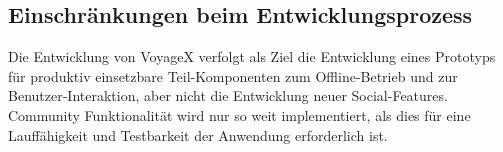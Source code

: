 \subsection{Einschränkungen beim Entwicklungsprozess}\label{4_ES}
Die Entwicklung von VoyageX verfolgt als Ziel die Entwicklung eines Prototyps für produktiv einsetzbare Teil-Komponenten zum Offline-Betrieb und zur Benutzer-Interaktion, aber nicht die Entwicklung neuer Social-Features. Community Funktionalität wird nur so weit implementiert, als dies für eine Lauffähigkeit und Testbarkeit der Anwendung erforderlich ist.


\newpage

%
%
